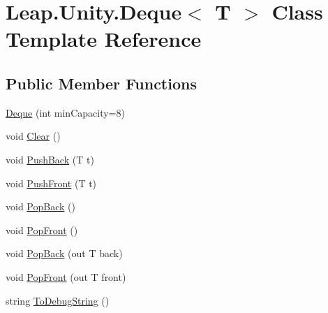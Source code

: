 \hypertarget{class_leap_1_1_unity_1_1_deque}{}\section{Leap.\+Unity.\+Deque$<$ T $>$ Class Template Reference}
\label{class_leap_1_1_unity_1_1_deque}
\subsection*{Public Member Functions}
\begin{DoxyCompactItemize}
\item 
\mbox{\hyperlink{class_leap_1_1_unity_1_1_deque_af2f33588f51a6337080c2daf710c5a59}{Deque}} (int min\+Capacity=8)
\item 
void \mbox{\hyperlink{class_leap_1_1_unity_1_1_deque_aaefa3c4fb909affdb5a8eee5affbe603}{Clear}} ()
\item 
void \mbox{\hyperlink{class_leap_1_1_unity_1_1_deque_a4ee63cee34a27e19b6631b07b918103f}{Push\+Back}} (T t)
\item 
void \mbox{\hyperlink{class_leap_1_1_unity_1_1_deque_ad138b4500ea49069cf1ca653124b42ec}{Push\+Front}} (T t)
\item 
void \mbox{\hyperlink{class_leap_1_1_unity_1_1_deque_a88278111a5e6310bdcef74f0f7306260}{Pop\+Back}} ()
\item 
void \mbox{\hyperlink{class_leap_1_1_unity_1_1_deque_a3a469f3d2a550481a770ab90824c2ab5}{Pop\+Front}} ()
\item 
void \mbox{\hyperlink{class_leap_1_1_unity_1_1_deque_ac9dac7bc414537d08841c3134e036e96}{Pop\+Back}} (out T back)
\item 
void \mbox{\hyperlink{class_leap_1_1_unity_1_1_deque_a5074f34c072124f745e57c6440a51a4c}{Pop\+Front}} (out T front)
\item 
string \mbox{\hyperlink{class_leap_1_1_unity_1_1_deque_a2b65e86dacf65e14275e49d76737caab}{To\+Debug\+String}} ()
\end{DoxyCompactItemize}
